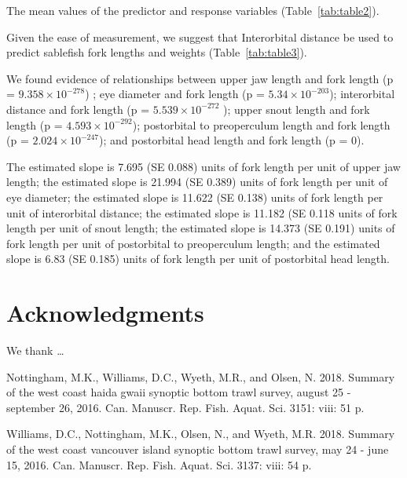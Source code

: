 \documentclass[12pt]{article}\usepackage[]{graphicx}\usepackage[]{color}
\begin{document}
The mean values of the predictor and response variables (Table~\ref{tab:table2}).

Given the ease of measurement, we suggest that Interorbital distance be used to predict sablefish fork lengths and weights (Table~\ref{tab:table3}).

We found evidence of relationships between upper jaw length and fork length (p = \ensuremath{9.358\times 10^{-278}}) ; eye diameter and fork length (p = \ensuremath{5.34\times 10^{-203}}); interorbital distance and fork length (p = \ensuremath{5.539\times 10^{-272}} ); upper snout length and fork length (p = \ensuremath{4.593\times 10^{-292}}); postorbital to preoperculum length and fork length (p = \ensuremath{2.024\times 10^{-247}}); and postorbital head length and fork length (p = 0).

The estimated slope is 7.695 (SE 0.088) units of fork length per unit of upper jaw length; the estimated slope is 21.994 (SE 0.389) units of fork length per unit of eye diameter; the estimated slope is 11.622 (SE 0.138) units of fork length per unit of interorbital distance; the estimated slope is 11.182 (SE 0.118 units of fork length per unit of snout length; the estimated slope is 14.373 (SE 0.191) units of fork length per unit of postorbital to preoperculum length; and the estimated slope is 6.83 (SE 0.185) units of fork length per unit of postorbital head length.

\hypertarget{acknowledgments}{%
\section{Acknowledgments}\label{acknowledgments}}

We thank \ldots{}

\hypertarget{refs}{}
\leavevmode\hypertarget{ref-Nottingham2018}{}%
Nottingham, M.K., Williams, D.C., Wyeth, M.R., and Olsen, N. 2018. Summary of the west coast haida gwaii synoptic bottom trawl survey, august 25 - september 26, 2016. Can. Manuscr. Rep. Fish. Aquat. Sci. 3151: viii: 51 p.

\leavevmode\hypertarget{ref-Williams2018}{}%
Williams, D.C., Nottingham, M.K., Olsen, N., and Wyeth, M.R. 2018. Summary of the west coast vancouver island synoptic bottom trawl survey, may 24 - june 15, 2016. Can. Manuscr. Rep. Fish. Aquat. Sci. 3137: viii: 54 p.
\end{document}
